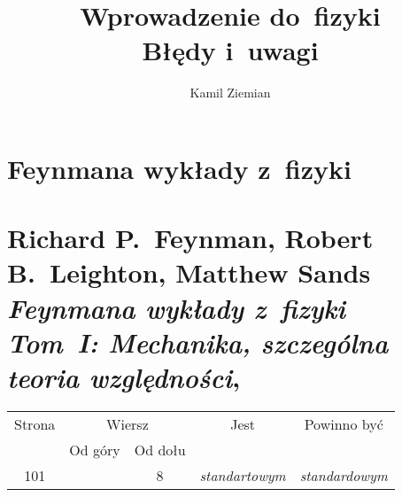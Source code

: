 \documentclass[a4paper,11pt]{article}
\title{Wprowadzenie do~fizyki \\
  {\Large Błędy i~uwagi}}
\author{Kamil Ziemian}
\numberwithin{equation}{section}
\begin{document}





\maketitle %





\section{Feynmana wykłady z~fizyki}

\VerSpaceTwo



\section{Richard P.~Feynman, Robert B.~Leighton, Matthew
  Sands \\
  \textit{Feynmana wykłady z~fizyki} \\
  \textit{Tom~I: Mechanika, szczególna teoria względności},
  \cite{FeynmanEtAlWykladyZFizykiVolI2004}}


\vspace{0em}




\begin{center}

  \begin{tabular}{|c|c|c|c|c|}
    \hline
    Strona & \multicolumn{2}{c|}{Wiersz} & Jest
                              & Powinno być \\ \cline{2-3}
    & Od góry & Od dołu & & \\
    \hline
    101 & &  8 & \textit{standartowym} & \textit{standardowym} \\
    \hline
  \end{tabular}

\end{center}
\end{document}
